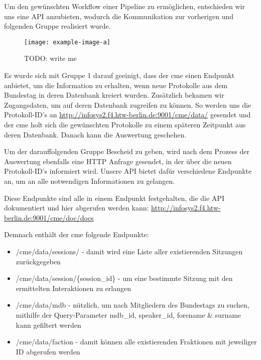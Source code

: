 Um den gewünschten Workflow einer Pipeline zu ermöglichen, entschieden wir
uns eine API anzubieten, wodurch die Kommunikation zur vorherigen und
folgenden Gruppe realisiert wurde.

\begin{figure}[ht]
    \begin{center}
        \texttt{[image: example-image-a]}
    \end{center}
    \caption{TODO: write me}
    \label{fig:03_api_call_flow}
\end{figure}

Es wurde sich mit Gruppe 1 darauf geeinigt, dass der \gls{cme} einen Endpunkt
anbietet, um die Information zu erhalten, wenn neue Protokolle aus dem
Bundestag in deren Datenbank kreiert wurden. Zusätzlich bekamen wir
Zugangsdaten, um auf deren Datenbank zugreifen zu können. So werden uns die
Protokoll-ID's an \url{http://infosys2.f4.htw-berlin.de:9001/cme/data/} gesendet
und der \gls{cme} holt sich die gewünschten Protokolle zu einem späteren Zeitpunkt
aus deren Datenbank. Danach kann die Auswertung geschehen.

Um der darauffolgenden Gruppe Bescheid zu geben, wird nach dem Prozess der
Auswertung ebenfalls eine HTTP Anfrage gesendet, in der über die neuen
Protokoll-ID's informiert wird. Unsere API bietet dafür verschiedene Endpunkte
an, um an alle notwendigen Informationen zu gelangen.

Diese Endpunkte sind alle in einem Endpunkt festgehalten, die die API
dokumentiert und hier abgerufen werden kann:
\url{http://infosys2.f4.htw-berlin.de:9001/cme/doc/docs}

Demnach enthält der \gls{cme} folgende Endpunkte:
\begin{itemize}
    \item /cme/data/sessions/ - damit wird eine Liste aller existierenden
        Sitzungen zurückgegeben
    \item /cme/data/session/\{session\_id\} - um eine bestimmte Sitzung mit den
        ermittelten Interaktionen zu erlangen
    \item /cme/data/mdb - nützlich, um nach Mitgliedern des Bundestags zu
        suchen, mithilfe der Query-Parameter mdb\_id, speaker\_id, forename
        \& surname kann gefiltert werden
    \item /cme/data/faction - damit können alle existierenden Fraktionen mit
        jeweiliger ID abgerufen werden
\end{itemize}

